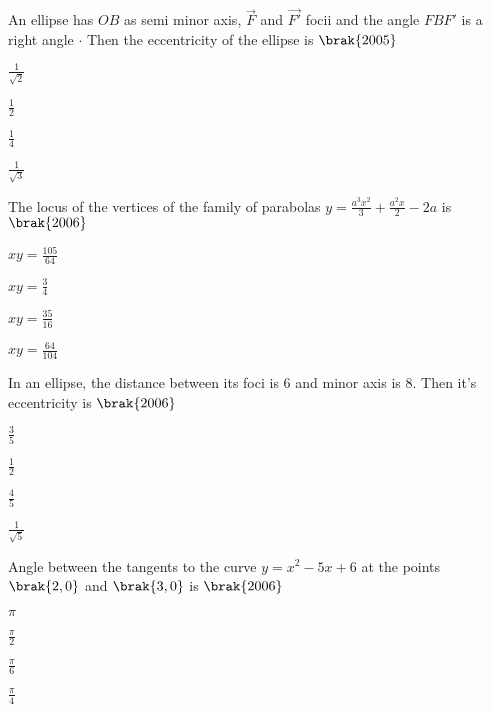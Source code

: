 \hfill
\item An ellipse has {$ OB $} as semi minor axis, {$\vec{F}$} and {$ \vec{F'} $} focii and the angle {$ FBF' $} is a right angle {$ \cdot $} Then the eccentricity of the ellipse is
\hfill
\hfill{{$ \brak{2005} $}}
\begin{enumerate}
\begin{multicols}{2}
\item {$ \frac{1}{\sqrt2} $}
\item {$ \frac{1}{2} $}
\item {$ \frac{1}{4} $}
\item {$ \frac{1}{\sqrt3} $}
\end{multicols}
\end{enumerate}
\hfill
\item The locus of the vertices of the family of parabolas {$ y = \frac{a^3 x^2}{3} + \frac{a^2 x}{2} - 2a  $} is 
\hfill{{$ \brak{2006} $}}
\begin{enumerate}	
\begin{multicols}{2}
\item {$ xy = \frac{105}{64} $}
\item {$ xy = \frac{3}{4} $}
\item {$ xy = \frac{35}{16} $}
\item {$ xy = \frac{64}{104} $}
\end{multicols}
\end{enumerate}
\hfill
\item In an ellipse, the distance between its foci is 6 and minor axis is 8. Then it's eccentricity is
\hfill
\hfill{{$ \brak{2006} $}}
\begin{enumerate}
\begin{multicols}{2}
\item {$ \frac{3}{5} $}
\item {$ \frac{1}{2} $}
\item {$ \frac{4}{5} $}
\item {$ \frac{1}{\sqrt5} $}
\end{multicols}
\end{enumerate}
\hfill
\item Angle between the tangents to the curve {$ y = x^2 -5x + 6 $} at the points {$ \brak{2,0} $} and {$ \brak{3,0} $} is
\hfill
\hfill{{$ \brak{2006} $}}
\begin{enumerate}
\begin{multicols}{2}
\item {$ {\pi} $}
\item {$ \frac{\pi}{2} $}
\item {$ \frac{\pi}{6} $}
\item {$ \frac{\pi}{4} $}
\end{multicols}
\end{enumerate}
